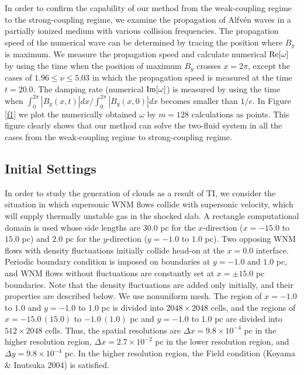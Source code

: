 \documentclass[12pt,preprint]{aastex}
\begin{document}
In order to confirm the capability of our method from the weak-coupling regime to the strong-coupling regime, we examine the propagation of Alfv\'en waves in a partially ionized medium with various collision frequencies.
The propagation speed of the numerical wave can be determined by tracing the position where $B_{y}$ is maximum.
We measure the propagation speed and calculate numerical ${\rm Re}[\omega]$ by using the time when the position of maximum $B_{y}$ crosses $x=2\pi$, except the cases of $1.96\le\nu\le5.03$ in which the propagation speed is measured at the time $t=20.0$.
The damping rate (numerical ${\rm Im}[\omega]$) is measured by using the time when $\int_{0}^{2\pi}|B_{y}(x,t)|dx/\int_{0}^{2\pi}|B_{y}(x,0)|dx$ becomes smaller than $1/e$.
In Figure \ref{f1} we plot the numerically obtained $\omega$ by $m=128$ calculations as points.
This figure clearly shows that our method can solve the two-fluid system in all the cases from the weak-coupling regime to strong-coupling regime.

\subsection{Initial Settings}
In order to study the generation of clouds as a result of TI, we consider the situation in which supersonic WNM flows collide with supersonic velocity, which will supply thermally unstable gas in the shocked slab.
A rectangle computational domain is used whose side lengths are $30.0$ pc for the $x$-direction ($x=-15.0$ to $15.0$ pc) and $2.0$ pc for the $y$-direction ($y=-1.0$ to $1.0$ pc).
Two opposing WNM flows with density fluctuations initially collide head-on at the $x=0.0$ interface.
Periodic boundary condition is imposed on boundaries at $y=-1.0$ and $1.0$ pc, and WNM flows without fluctuations are constantly set at $x=\pm15.0$ pc boundaries.
Note that the density fluctuations are added only initially, and their properties are described below. 
We use nonuniform mesh.
The region of $x=-1.0$ to $1.0$ and $y=-1.0$ to $1.0$ pc is divided into $2048\times 2048$ cells, and the regions of $x=-15.0\,(15.0)$ to $-1.0\,(1.0)$ pc and $y=-1.0$ to $1.0$ pc are divided into $512\times 2048$ cells.
Thus, the spatial resolutions are $\Delta x= 9.8 \times 10^{-4}$ pc in the higher resolution region, $\Delta x= 2.7 \times 10^{-2}$ pc in the lower resolution region, and $\Delta y= 9.8 \times 10^{-4}$ pc.
In the higher resolution region, the Field condition (Koyama \& Inutsuka 2004) is satisfied.
\end{document}
